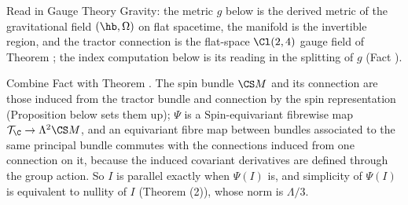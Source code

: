 Read in Gauge Theory Gravity: the metric $g$ below is the derived metric of the gravitational field $(\hb, \Omega)$ on flat spacetime, the manifold is the invertible region, and the tractor connection is the flat-space $\Cl(2,4)$ gauge field of Theorem ; the index computation below is its reading in the splitting of $g$ (Fact ).

Combine Fact  with Theorem . The spin bundle $\CS M$ and its connection are those induced from the tractor bundle and connection by the spin representation (Proposition  below sets them up); $\Psi$ is a $\mathrm{Spin}$-equivariant fibrewise map $\mathcal{T}_\C \to \Lambda^2\CS M$, and an equivariant fibre map between bundles associated to the same principal bundle commutes with the connections induced from one connection on it, because the induced covariant derivatives are defined through the group action. So $I$ is parallel exactly when $\Psi(I)$ is, and simplicity of $\Psi(I)$ is equivalent to nullity of $I$ (Theorem (2)), whose norm is $\Lambda/3$.
